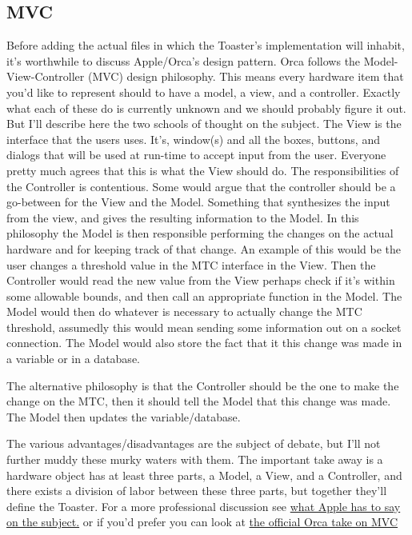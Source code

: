 \documentclass[12pt,a4paper]{article}
\begin{document}
 \subsection{MVC}
 Before adding the actual files in which the Toaster's implementation will inhabit,
 it's worthwhile to discuss  Apple/Orca's design pattern. 
 Orca follows the Model-View-Controller (MVC) design philosophy.
 This means every hardware item that you'd like to represent should to have a model, a view, and a controller.
 Exactly what each of these do is currently unknown and we should probably figure it out.
 But I'll describe here the two schools of thought on the subject.
 The View is the interface that the users uses. 
 It's, window(s) and all the boxes, buttons, and dialogs that will be used at run-time to accept input from the user.
  Everyone pretty much agrees that this is what the View should do.
  The responsibilities of the  Controller is contentious.
  Some would argue that the controller should be a go-between for the View and the Model.
  Something that synthesizes the input from the view, and gives the resulting information to the Model.
  In this philosophy the Model is then responsible performing the changes on the actual hardware and for keeping track of that change.
  An example of this would be the user changes a threshold value in the MTC interface in the View.
   Then the Controller would read the new value from the View perhaps check if it's within some allowable bounds, and then call an appropriate function in the Model.
   The Model would then do whatever is necessary to actually change the MTC threshold, assumedly this would mean sending some information out on a socket connection.
   The Model would also store the fact that it this change was made in a variable or in a database.
   
   The alternative philosophy is that the Controller should be the one to make the change on the MTC, then
   it should tell the Model that this change was made.
   The Model then updates the variable/database.
   
   The various advantages/disadvantages are the subject of debate, but I'll not further muddy these murky waters with them. 
   The important take away is a hardware object has at least three parts, a Model, a View, and a Controller,
   and there exists a division of labor between these three parts, but together they'll define the Toaster.
   For a more professional discussion see \href{https://developer.apple.com/library/ios/documentation/General/Conceptual/CocoaEncyclopedia/Model-View-Controller/Model-View-Controller.html}
   {what Apple has to say on the subject.} 
   or if you'd prefer you can look at 
   \href{http://orca.physics.unc.edu/Programming/Code_Overview.html}
   {the official Orca take on MVC}
   
\end{document}
